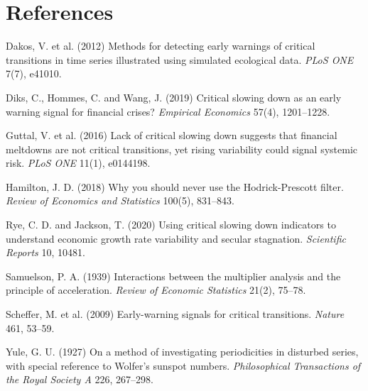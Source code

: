 \documentclass[11pt,a4paper]{article}
\begin{document}
\section*{References}
\small
\begin{description}\itemsep0pt
\item Dakos, V. et al. (2012) Methods for detecting early warnings of critical transitions in time series illustrated using simulated ecological data. \emph{PLoS ONE} 7(7), e41010.
\item Diks, C., Hommes, C. and Wang, J. (2019) Critical slowing down as an early warning signal for financial crises? \emph{Empirical Economics} 57(4), 1201--1228.
\item Guttal, V. et al. (2016) Lack of critical slowing down suggests that financial meltdowns are not critical transitions, yet rising variability could signal systemic risk. \emph{PLoS ONE} 11(1), e0144198.
\item Hamilton, J. D. (2018) Why you should never use the Hodrick-Prescott filter. \emph{Review of Economics and Statistics} 100(5), 831--843.
\item Rye, C. D. and Jackson, T. (2020) Using critical slowing down indicators to understand economic growth rate variability and secular stagnation. \emph{Scientific Reports} 10, 10481.
\item Samuelson, P. A. (1939) Interactions between the multiplier analysis and the principle of acceleration. \emph{Review of Economic Statistics} 21(2), 75--78.
\item Scheffer, M. et al. (2009) Early-warning signals for critical transitions. \emph{Nature} 461, 53--59.
\item Yule, G. U. (1927) On a method of investigating periodicities in disturbed series, with special reference to Wolfer's sunspot numbers. \emph{Philosophical Transactions of the Royal Society A} 226, 267--298.
\end{description}
\end{document}
